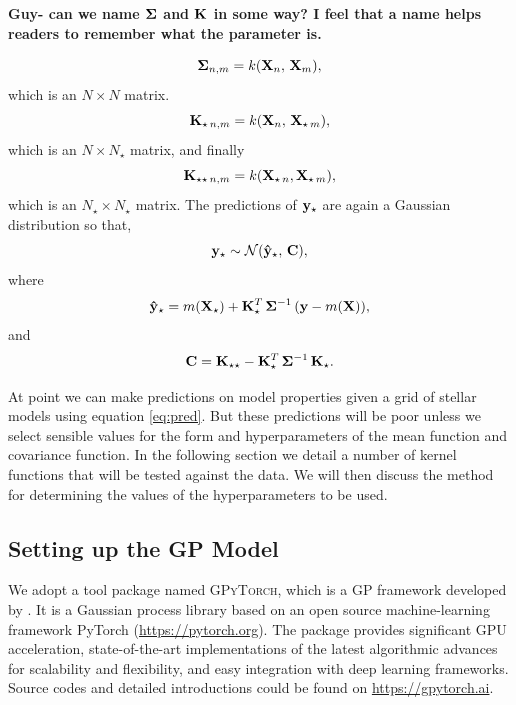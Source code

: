 {\bf Guy- can we name $\bf \Sigma$ and $\bf K$ in some way? I feel that a name helps readers to remember what the parameter is.}

\begin{equation}
{\bf \Sigma}_{n, m} = k({\bf X}_{n}, \, {\bf X}_{m}),
\end{equation}
which is an $N \times N$ matrix.
\begin{equation}
{\bf K}_{\star \, n, m} = k({\bf X}_{n}, \, { \bf X}_{\star \, m}),
\end{equation}
which is an $N \times N_{\star}$ matrix, and finally
\begin{equation}
{\bf K}_{\star \star \, n, m} = k({\bf X}_{\star \, n},  {\bf X}_{\star \,m}),
\end{equation}
which is an $N_{\star} \times N_{\star}$ matrix.
The predictions of $\bf y_{\star}$ are again a Gaussian distribution so that,
\begin{equation}
{\bf y}_{\star} \sim \mathcal{N}(\bf \hat{y}_{\star}, \, \bf C),
\label{eq:pred}
\end{equation}
where 
\begin{equation}
{\bf \hat{y}}_{\star} = m({\bf X}_{\star}) + {\bf K}_{\star}^{T} \, {\bf \Sigma}^{-1} \, ({\bf y} - m(\bf X)),
\end{equation}
and 
\begin{equation}
{\bf C} = {\bf K}_{\star \star} - {\bf K}_{\star}^{T} \, {\bf \Sigma}^{-1} \, {\bf K_{\star}}.
\end{equation}

At point we can make predictions on model properties given a grid of stellar models using equation \ref{eq:pred}.  But these predictions will be poor unless we select sensible values for the form and hyperparameters of the mean function and covariance function.  In the following section we detail a number of kernel functions that will be tested against the data.  We will then discuss the method for determining the values of the hyperparameters to be used.


\subsection{Setting up the GP Model}\label{sec:set_up}

We adopt a tool package named \textsc{GPyTorch}, which is a GP framework developed by \citet{gardner2018gpytorch}. It is a Gaussian process library based on an open source machine-learning framework PyTorch (\url{https://pytorch.org}). The package provides significant GPU acceleration, state-of-the-art implementations of the latest algorithmic advances for scalability and flexibility, and easy integration with deep learning frameworks. Source codes and detailed introductions could be found on \url{https://gpytorch.ai}.

